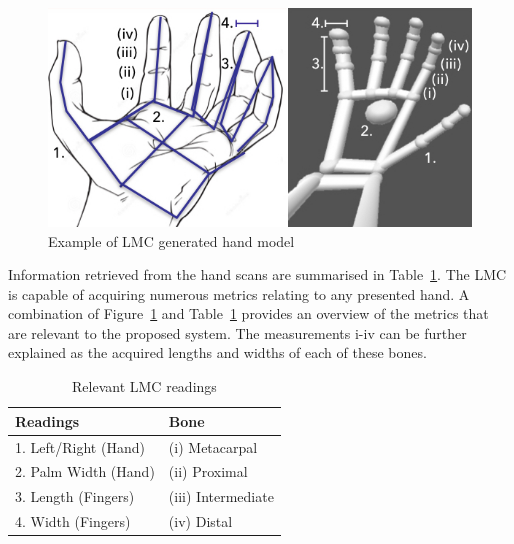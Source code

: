 
  
\begin{figure}[htbp!] 
\centering    
\includegraphics[width=1.0\textwidth]{Chapter2/Figs/Figure2-5.png}
\caption[Example of LMC generated hand model]{Example of LMC generated hand model}
\label{fig:Example_of_LMC_generated_hand_model}
\end{figure}

\begin{figure}
\centering
\def\svgwidth{\columnwidth}

\end{figure}



Information retrieved from the hand scans are summarised in Table~\ref{table: Relevant LMC readings}. The LMC is capable of acquiring numerous metrics relating to any presented hand. A combination of Figure~\ref{fig:Example_of_LMC_generated_hand_model} and Table~\ref{table: Relevant LMC readings} provides an overview of the metrics that are relevant to the proposed system. The measurements i-iv can be further explained as the acquired lengths and widths of each of these bones.

\begin{table}[h]
\caption{Relevant LMC readings}
\centering
 \begin{tabular}{|p{} | p{}|} 
 \hline
	\textbf{Readings} & \textbf{Bone} \\ [1ex] 
 \hline\hline 
 1.	Left/Right (Hand) & (i) Metacarpal \\[1ex]
 \hline 
 2.	Palm Width (Hand) & (ii) Proximal \\[1ex]
 \hline
 3.	Length (Fingers) & (iii) Intermediate \\ [1ex] 
 \hline
 4.	Width (Fingers) & (iv) Distal \\ [1ex] 
 \hline
 \end{tabular}
 \label{table: Relevant LMC readings}
\end{table}


